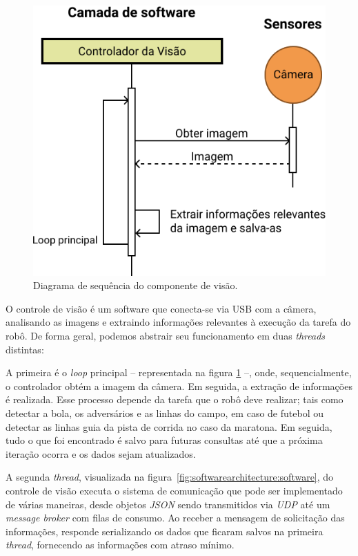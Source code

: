 \begin{figure}[h!]
	\centering
	\includegraphics[scale=1]{imagens/svg/softwarearchitecture-vision}
	\caption{Diagrama de sequência do componente de visão.}
	\label{fig:softwarearchitecture:vision}
\end{figure}

O controle de visão é um software que conecta-se via USB com a câmera, analisando as imagens e extraindo informações relevantes à execução da tarefa do robô. De forma geral, podemos abstrair seu funcionamento em duas \textit{threads} distintas:

A primeira é o \textit{loop} principal -- representada na figura \ref{fig:softwarearchitecture:vision} --, onde, sequencialmente, o controlador obtém a imagem da câmera. Em seguida, a extração de informações é realizada. Esse processo depende da tarefa que o robô deve realizar; tais como detectar a bola, os adversários e as linhas do campo, em caso de futebol ou detectar as linhas guia da pista de corrida no caso da maratona. Em seguida, tudo o que foi encontrado é salvo para futuras consultas até que a próxima iteração ocorra e os dados sejam atualizados.

A segunda \textit{thread}, visualizada na figura~\ref{fig:softwarearchitecture:software}, do controle de visão executa o sistema de comunicação que pode ser implementado de várias maneiras, desde objetos \textit{JSON} sendo transmitidos via \textit{UDP} até um \textit{message broker} com filas de consumo. Ao receber a mensagem de solicitação das informações, responde serializando os dados que ficaram salvos na primeira \textit{thread}, fornecendo as informações com atraso mínimo.

